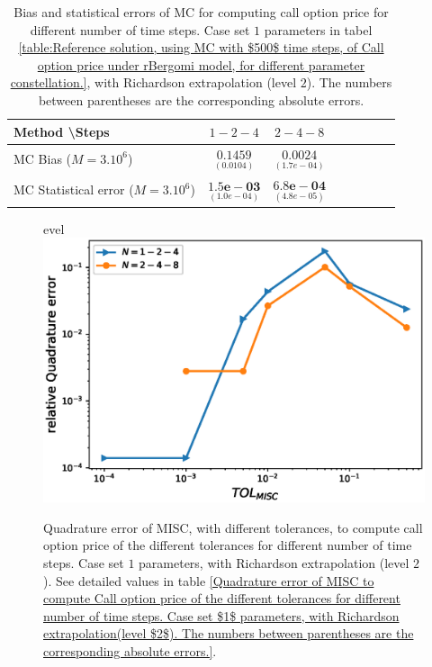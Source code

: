 \begin{table}[h!]
	\centering
	\begin{tabular}{l*{6}{c}r}
		Method \textbackslash  Steps            & $1-2-4$ & $2-4-8$  \\
		\hline
		MC  Bias ($M=3.10^6$)     &$\underset{( 0.0104)}{\mathbf{ 0.1459}}$  & $\underset{(    1.7e-04)}{\mathbf{0.0024}}$   \\	
		
		MC Statistical error ($M=3.10^6$)   & $\underset{( 1.0e-04)}{\mathbf{1.5e-03}}$  & $\underset{(   4.8e-05)}{\mathbf{    6.8e-04}}$  \\	
		
		
		
		\hline
	\end{tabular}
	\caption{Bias and statistical errors of MC   for computing call option price  for different number of time steps. Case set $1$ parameters in tabel \ref{table:Reference solution, using MC with $500$ time steps, of Call option price under rBergomi model, for different parameter constellation.}, with Richardson extrapolation (level $2$). The numbers between parentheses are the corresponding absolute errors.}
	\label{Bias and Statistical errors of MC ($M=3.10^6$)  for computing Call option price  for different number of time steps. Case set $1$ parameters, with Richardson extrapolation (level2). The numbers between parentheses are the corresponding absolute errors.}
\end{table}





\begin{figure}[h!]
	\centering
	evel\includegraphics[width=0.5\linewidth]{./figures/rBergomi_MISC_quadratre_error/vs_TOL/set1/relative_quad_error_wrt_MISC_TOL_set1_rich_level2}
	
	
	\caption{Quadrature error of MISC, with different tolerances, to compute call option price of the different tolerances for different number of time steps. Case  set $1$ parameters, with Richardson extrapolation (level $2$).  See detailed values  in table \ref{Quadrature error of MISC to compute Call option price of the different tolerances for different number of time steps. Case set $1$ parameters, with Richardson extrapolation(level $2$). The numbers between parentheses are the corresponding absolute errors.}.}
	\label{fig:Quadrature_error_set1_rich_level2}
\end{figure}




